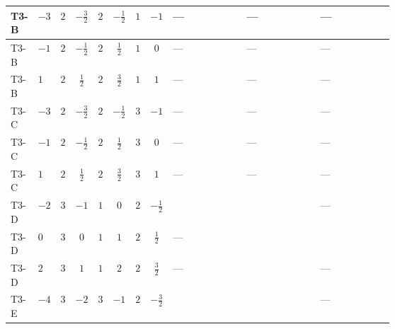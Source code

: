\documentclass[8pt]{article}
\begin{document}
\begin{landscape}
\begin{longtable}{@{}llcccccc >{\raggedright\arraybackslash}p{0.21\linewidth} >{\raggedright\arraybackslash}p{0.21\linewidth} >{\raggedright\arraybackslash}p{0.21\linewidth}@{}}
\midrule
T3-B & $-3$ & $2$ & $-\frac{3}{2}$ & $2$ & $-\frac{1}{2}$ & $1$ & $-1$ & --- & --- & --- \\
\midrule
T3-B & $-1$ & $2$ & $-\frac{1}{2}$ & $2$ & $\frac{1}{2}$ & $1$ & $0$ & --- & --- & --- \\
\midrule
T3-B & $1$ & $2$ & $\frac{1}{2}$ & $2$ & $\frac{3}{2}$ & $1$ & $1$ & --- & --- & --- \\
\midrule
T3-C & $-3$ & $2$ & $-\frac{3}{2}$ & $2$ & $-\frac{1}{2}$ & $3$ & $-1$ & --- & --- & --- \\
\midrule
T3-C & $-1$ & $2$ & $-\frac{1}{2}$ & $2$ & $\frac{1}{2}$ & $3$ & $0$ & --- & --- & --- \\
\midrule
T3-C & $1$ & $2$ & $\frac{1}{2}$ & $2$ & $\frac{3}{2}$ & $3$ & $1$ & --- & --- & --- \\
\midrule
T3-D & $-2$ & $3$ & $-1$ & $1$ & $0$ & $2$ & $-\frac{1}{2}$ & \scriptsize\adjustbox{max width=\linewidth}{$\begin{gathered} +{g_1}^2 \left(-4 {g_2}^2-\frac{15 {\lambda_{HS_1}^{(A)}}}{2}\right)\end{gathered}$} & \scriptsize\adjustbox{max width=\linewidth}{$\begin{gathered} -\frac{33 {g_2}^2 {\lambda_{HS_1}^{(A)}}}{2}\end{gathered}$} & --- \\
\midrule
T3-D & $0$ & $3$ & $0$ & $1$ & $1$ & $2$ & $\frac{1}{2}$ & --- & \scriptsize\adjustbox{max width=\linewidth}{$\begin{gathered} -\frac{33 {g_2}^2 {\lambda_{HS_1}^{(A)}}}{2}\end{gathered}$} & \scriptsize\adjustbox{max width=\linewidth}{$\begin{gathered} -\frac{3 {g_1}^2 {\lambda_{HS_1}^{(A)}}}{2}\end{gathered}$} \\
\midrule
T3-D & $2$ & $3$ & $1$ & $1$ & $2$ & $2$ & $\frac{3}{2}$ & --- & \scriptsize\adjustbox{max width=\linewidth}{$\begin{gathered} -\frac{33 {g_2}^2 {\lambda_{HS_1}^{(A)}}}{2}\end{gathered}$} & --- \\
\midrule
T3-E & $-4$ & $3$ & $-2$ & $3$ & $-1$ & $2$ & $-\frac{3}{2}$ & \scriptsize\adjustbox{max width=\linewidth}{$\begin{gathered} +{g_1}^2 \left(-8 {g_2}^2-\frac{51 {\lambda_{HS_1}^{(A)}}}{2}\right)\end{gathered}$} & \scriptsize\adjustbox{max width=\linewidth}{$\begin{gathered} -\frac{33 {g_2}^2 {\lambda_{HS_1}^{(A)}}}{2}\end{gathered}$} & --- \\

\end{longtable}
\end{landscape}
\end{document}
